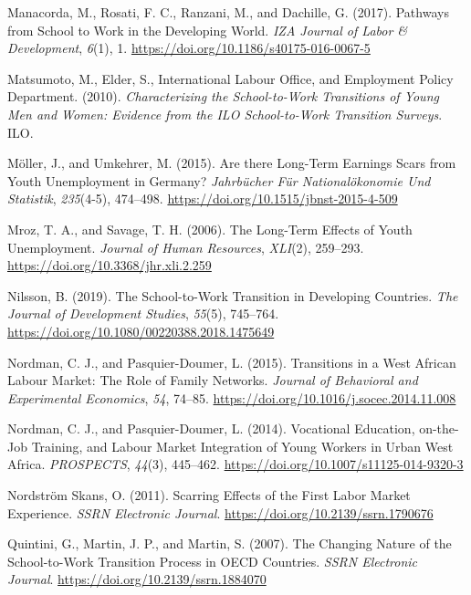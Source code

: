 \documentclass[
  11pt,
a4paper
]{article}
\newlength{\cslhangindent}
\newenvironment{CSLReferences}[2] %
 {%
  \setlength{\parindent}{0pt}
  \ifodd #1 \everypar{\setlength{\hangindent}{\cslhangindent}}\ignorespaces\fi
  \ifnum #2 > 0
  \setlength{\parskip}{#2\baselineskip}
  \fi
 }%
 {}
\begin{document}
\begin{CSLReferences}{1}{0}
\leavevmode{}%
Manacorda, M., Rosati, F. C., Ranzani, M., and Dachille, G. (2017). Pathways from {School} to {Work} in the {Developing World}. \emph{IZA Journal of Labor \& Development}, \emph{6}(1), 1. \url{https://doi.org/10.1186/s40175-016-0067-5}

\leavevmode{}%
Matsumoto, M., Elder, S., International Labour Office, and Employment Policy Department. (2010). \emph{Characterizing the {School-to-Work Transitions} of {Young Men} and {Women}: {Evidence} from the {ILO School-to-Work Transition Surveys}}. {ILO}.

\leavevmode{}%
Möller, J., and Umkehrer, M. (2015). Are there {Long-Term Earnings Scars} from {Youth Unemployment} in {Germany}? \emph{Jahrbücher Für Nationalökonomie Und Statistik}, \emph{235}(4-5), 474--498. \url{https://doi.org/10.1515/jbnst-2015-4-509}

\leavevmode{}%
Mroz, T. A., and Savage, T. H. (2006). The {Long-Term Effects} of {Youth Unemployment}. \emph{Journal of Human Resources}, \emph{XLI}(2), 259--293. \url{https://doi.org/10.3368/jhr.xli.2.259}

\leavevmode{}%
Nilsson, B. (2019). The {School-to-Work Transition} in {Developing Countries}. \emph{The Journal of Development Studies}, \emph{55}(5), 745--764. \url{https://doi.org/10.1080/00220388.2018.1475649}

\leavevmode{}%
Nordman, C. J., and Pasquier-Doumer, L. (2015). Transitions in a {West African Labour Market}: {The Role} of {Family Networks}. \emph{Journal of Behavioral and Experimental Economics}, \emph{54}, 74--85. \url{https://doi.org/10.1016/j.socec.2014.11.008}

\leavevmode{}%
Nordman, C. J., and Pasquier-Doumer, L. (2014). Vocational {Education}, on-the-{Job Training}, and {Labour Market Integration} of {Young Workers} in {Urban West Africa}. \emph{PROSPECTS}, \emph{44}(3), 445--462. \url{https://doi.org/10.1007/s11125-014-9320-3}

\leavevmode{}%
Nordström Skans, O. (2011). Scarring {Effects} of the {First Labor Market Experience}. \emph{SSRN Electronic Journal}. \url{https://doi.org/10.2139/ssrn.1790676}

\leavevmode{}%
Quintini, G., Martin, J. P., and Martin, S. (2007). The {Changing Nature} of the {School-to-Work Transition Process} in {OECD Countries}. \emph{SSRN Electronic Journal}. \url{https://doi.org/10.2139/ssrn.1884070}


\end{CSLReferences}
\end{document}
